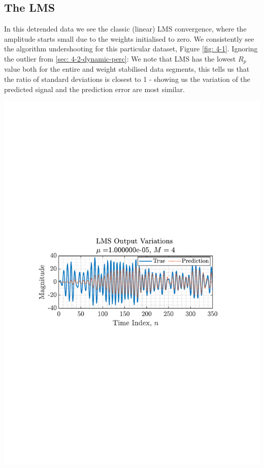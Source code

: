 \documentclass[12pt]{article}
\begin{document}
	\subsection{The LMS} \label{sec: 4-1-LMS}
		\begin{minipage}[b]{0.49\textwidth}
			In this detrended data we see the classic (linear) LMS convergence, where the amplitude starts small due to the weights initialised to zero. We consistently see the algorithm undershooting for this particular dataset, Figure \ref{fig: 4-1}. Ignoring the outlier from \ref{sec: 4-2-dynamic-perc}: We note that LMS has the lowest $R_p$ value both for the entire and weight stabilised data segments, this tells us that the ratio of standard deviations is closest to 1 - showing us the variation of the predicted signal and the prediction error are  most similar.
		\end{minipage}%
		\begin{minipage}{0.04\textwidth}
			\hspace*{0.04\textwidth}
		\end{minipage}%
		\begin{minipage}[b]{0.49\textwidth}
			\centering
			\includegraphics[trim={2.2cm 11.2cm 3.15cm  11.2cm}, clip, width=\textwidth]{../MATLAB/figures/q4_1_fig01.pdf} 
			\captionsetup{justification=centering}
			\label{fig: 4-1}
		\end{minipage}%
	
\end{document}

